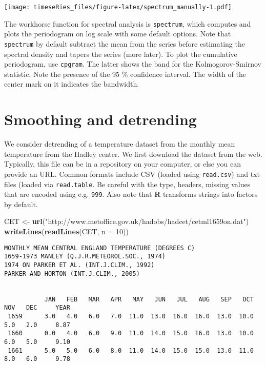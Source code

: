 \documentclass[]{book}
\newenvironment{Shaded}{\begin{snugshade}}{\end{snugshade}}
\newcommand{\KeywordTok}[1]{\textcolor[rgb]{0.13,0.29,0.53}{\textbf{#1}}}
\newcommand{\DataTypeTok}[1]{\textcolor[rgb]{0.13,0.29,0.53}{#1}}
\newcommand{\DecValTok}[1]{\textcolor[rgb]{0.00,0.00,0.81}{#1}}
\newcommand{\StringTok}[1]{\textcolor[rgb]{0.31,0.60,0.02}{#1}}
\newcommand{\NormalTok}[1]{#1}
\begin{document}
\texttt{[image: timeseRies\_files/figure-latex/spectrum\_manually-1.pdf]}

The workhorse function for spectral analysis is \texttt{spectrum}, which
computes and plots the periodogram on log scale with some default
options. Note that \texttt{spectrum} by default subtract the mean from
the series before estimating the spectral density and tapers the series
(more later). To plot the cumulative periodogram, use \texttt{cpgram}.
The latter shows the band for the Kolmogorov-Smirnov statistic. Note the
presence of the 95 \% confidence interval. The width of the center mark
on it indicates the bandwidth.

\section{Smoothing and detrending}\label{smoothing-and-detrending}

We consider detrending of a temperature dataset from the monthly mean
temperature from the Hadley center. We first download the dataset from
the web. Typically, this file can be in a repository on your computer,
or else you can provide an URL. Common formats include CSV (loaded using
\texttt{read.csv}) and txt files (loaded via \texttt{read.table}. Be
careful with the type, headers, missing values that are encoded using
e.g. \texttt{999}. Also note that \textbf{R} transforms strings into
factors by default.

\begin{Shaded}
\begin{Highlighting}[]
\NormalTok{CET <-}\StringTok{ }\KeywordTok{url}\NormalTok{(}\StringTok{"http://www.metoffice.gov.uk/hadobs/hadcet/cetml1659on.dat"}\NormalTok{)}
\KeywordTok{writeLines}\NormalTok{(}\KeywordTok{readLines}\NormalTok{(CET, }\DataTypeTok{n =} \DecValTok{10}\NormalTok{))}
\end{Highlighting}
\end{Shaded}

\begin{verbatim}
MONTHLY MEAN CENTRAL ENGLAND TEMPERATURE (DEGREES C)                                     
1659-1973 MANLEY (Q.J.R.METEOROL.SOC., 1974)                                             
1974 ON PARKER ET AL. (INT.J.CLIM., 1992)                                                
PARKER AND HORTON (INT.J.CLIM., 2005)                                                    
                                                                                         
                                                                                         
           JAN   FEB   MAR   APR   MAY   JUN   JUL   AUG   SEP   OCT   NOV   DEC     YEAR
 1659      3.0   4.0   6.0   7.0  11.0  13.0  16.0  16.0  13.0  10.0   5.0   2.0     8.87
 1660      0.0   4.0   6.0   9.0  11.0  14.0  15.0  16.0  13.0  10.0   6.0   5.0     9.10
 1661      5.0   5.0   6.0   8.0  11.0  14.0  15.0  15.0  13.0  11.0   8.0   6.0     9.78
\end{verbatim}
\end{document}
